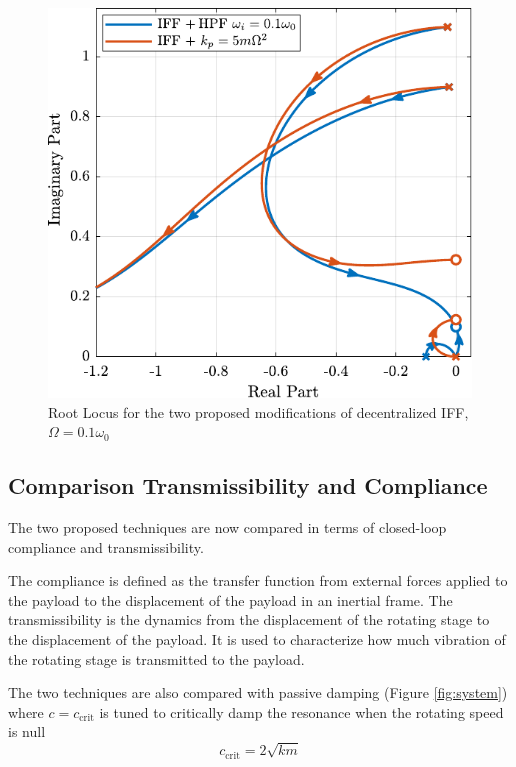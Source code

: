 \documentclass{ISMA_USD2020}
\begin{document}
\begin{figure}[htbp]
\centering
\includegraphics[scale=1]{figs/comp_root_locus.pdf}
\caption{\label{fig:comp_root_locus}Root Locus for the two proposed modifications of decentralized IFF, \(\Omega = 0.1 \omega_0\)}
\end{figure}

\subsection{Comparison Transmissibility and Compliance}
\label{sec:org411478b}
The two proposed techniques are now compared in terms of closed-loop compliance and transmissibility.

The compliance is defined as the transfer function from external forces applied to the payload to the displacement of the payload in an inertial frame.
The transmissibility is the dynamics from the displacement of the rotating stage to the displacement of the payload.
It is used to characterize how much vibration of the rotating stage is transmitted to the payload.

The two techniques are also compared with passive damping (Figure \ref{fig:system}) where \(c = c_\text{crit}\) is tuned to critically damp the resonance when the rotating speed is null
\begin{equation}
  c_\text{crit} = 2 \sqrt{k m}
\end{equation}
\end{document}
